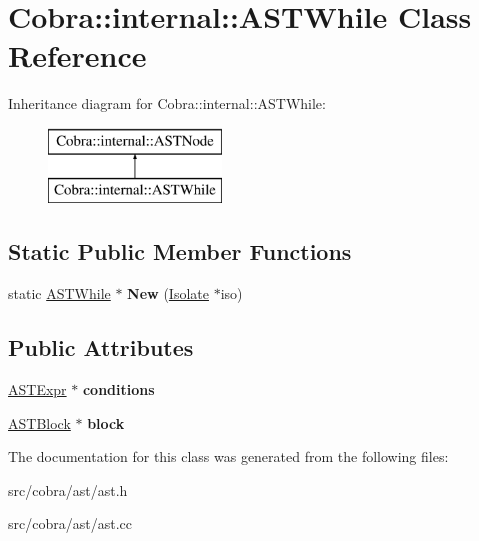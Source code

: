 \hypertarget{class_cobra_1_1internal_1_1_a_s_t_while}{\section{Cobra\+:\+:internal\+:\+:A\+S\+T\+While Class Reference}
\label{class_cobra_1_1internal_1_1_a_s_t_while}
}
Inheritance diagram for Cobra\+:\+:internal\+:\+:A\+S\+T\+While\+:\begin{figure}[H]
\begin{center}
\leavevmode
\includegraphics[height=2.000000cm]{class_cobra_1_1internal_1_1_a_s_t_while}
\end{center}
\end{figure}
\subsection*{Static Public Member Functions}
\begin{DoxyCompactItemize}
\item 
\hypertarget{class_cobra_1_1internal_1_1_a_s_t_while_abe1da45569929223098fb6c51cdae856}{static \hyperlink{class_cobra_1_1internal_1_1_a_s_t_while}{A\+S\+T\+While} $\ast$ {\bfseries New} (\hyperlink{class_cobra_1_1internal_1_1_isolate}{Isolate} $\ast$iso)}\label{class_cobra_1_1internal_1_1_a_s_t_while_abe1da45569929223098fb6c51cdae856}

\end{DoxyCompactItemize}
\subsection*{Public Attributes}
\begin{DoxyCompactItemize}
\item 
\hypertarget{class_cobra_1_1internal_1_1_a_s_t_while_a8a97bd833a835abb8238263baa3f559b}{\hyperlink{class_cobra_1_1internal_1_1_a_s_t_expr}{A\+S\+T\+Expr} $\ast$ {\bfseries conditions}}\label{class_cobra_1_1internal_1_1_a_s_t_while_a8a97bd833a835abb8238263baa3f559b}

\item 
\hypertarget{class_cobra_1_1internal_1_1_a_s_t_while_a625f9bfdcd435fc72a6bf54cbac8984f}{\hyperlink{class_cobra_1_1internal_1_1_a_s_t_block}{A\+S\+T\+Block} $\ast$ {\bfseries block}}\label{class_cobra_1_1internal_1_1_a_s_t_while_a625f9bfdcd435fc72a6bf54cbac8984f}

\end{DoxyCompactItemize}


The documentation for this class was generated from the following files\+:\begin{DoxyCompactItemize}
\item 
src/cobra/ast/ast.\+h\item 
src/cobra/ast/ast.\+cc\end{DoxyCompactItemize}
